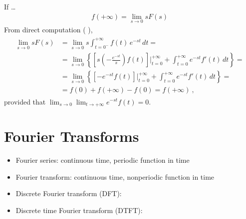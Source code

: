 \documentclass[letterpaper,10pt,english]{jupyterBook}
\begin{document}
\sphinxAtStartPar
{} If …
\begin{equation*}
\begin{split}f(+\infty) = \lim_{s \rightarrow 0} s F(s)\end{split}
\end{equation*}
\sphinxAtStartPar
From direct computation ( ),
\begin{equation*}
\begin{split}\begin{aligned}
 \lim_{s \rightarrow 0} s F(s)
 & = \lim_{s \rightarrow 0} s \int_{t = 0^-}^{+\infty} f(t) \, e^{-st} \, dt = \\
 & = \lim_{s \rightarrow 0} \left\{ \left[s \left(-\frac{e^{-st}}{s}\right)f(t) \right]\bigg|_{t=0}^{+\infty} + \int_{t=0}^{+\infty} e^{-st} f'(t) \, dt \right\} = \\
 & = \lim_{s \rightarrow 0} \left\{ \left[-e^{-st} f(t) \right]\bigg|_{t=0}^{+\infty} + \int_{t=0}^{+\infty} e^{-st} f'(t) \, dt \right\} = \\
 & = f(0) + f(+\infty) - f(0) = f(+\infty) \ ,
\end{aligned}\end{split}
\end{equation*}
\sphinxAtStartPar
provided that \(\lim_{s \rightarrow 0} \lim_{t \rightarrow +\infty} e^{-s t} f(t) = 0\).

\sphinxstepscope


\chapter{Fourier Transforms}
\label{\detokenize{ch/complex/fourier:fourier-transforms}}\label{\detokenize{ch/complex/fourier:complex-fourier}}\label{\detokenize{ch/complex/fourier::doc}}\begin{itemize}
\item {} 
\sphinxAtStartPar
Fourier series: continuous time, periodic function in time

\item {} 
\sphinxAtStartPar
Fourier transform: continuous time, non\sphinxhyphen{}periodic function in time

\item {} 
\sphinxAtStartPar
Discrete Fourier transform (DFT):

\item {} 
\sphinxAtStartPar
Discrete time Fourier transform (DTFT):

\end{itemize}
\end{document}
